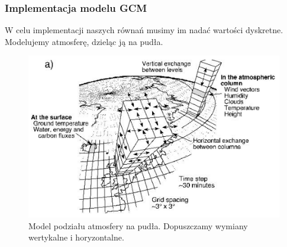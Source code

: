 \documentclass{beamer}
\begin{document}
\begin{frame}
	\frametitle{Implementacja modelu GCM}
	W celu implementacji naszych równań musimy im nadać wartości dyskretne.
	Modelujemy atmosferę, dzieląc ją na pudła.
	
	\begin{figure}[h]
		\begin{center}
			\includegraphics[width=0.7\linewidth]{images/box.png}
			\caption{Model podziału atmosfery na pudła. Dopuszczamy wymiany wertykalne i horyzontalne.\cite{b1}}
		\end{center}
	\end{figure}
	
\end{frame}
\end{document}
